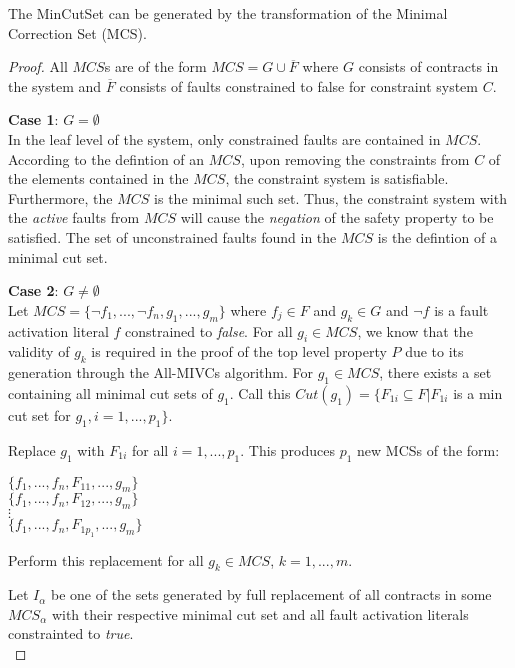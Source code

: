 \begin{theorem}  The MinCutSet can be generated by the transformation of the Minimal Correction Set (MCS).

\begin{proof}  All $MCS$s are of the form $MCS = G \cup \overline{F}$ where $G$ consists of contracts in the system and $\overline{F}$ consists of faults constrained to false for constraint system $C$. 

\textbf{Case 1}: $G = \emptyset$\\
In the leaf level of the system, only constrained faults are contained in $MCS$. According to the defintion of an $MCS$, upon removing the constraints from $C$ of the elements contained in the $MCS$, the constraint system is satisfiable. Furthermore, the $MCS$ is the minimal such set. Thus, the constraint system with the \textit{active} faults from $MCS$ will cause the \textit{negation} of the safety property to be satisfied. The set of unconstrained faults found in the $MCS$ is the defintion of a minimal cut set. 

\textbf{Case 2}: $G \neq \emptyset$\\
Let $MCS = \{\lnot f_1,...,\lnot f_n,g_1,...,g_m\}$ where $f_j \in F$ and $g_k \in G$ and $\lnot f$ is a fault activation literal $f$ constrained to \textit{false}. 
For all $g_i \in MCS$, we know that the validity of $g_k$ is required in the proof of the top level property $P$ due to its generation through the All-MIVCs algorithm. For $g_1 \in MCS$, there exists a set containing all minimal cut sets of $g_1$. Call this $Cut(g_1) = \{F_{1i} \subseteq F | F_{1i}$ is a min cut set for $g_1, i = 1,...,p_1\}$. 

Replace $g_1$ with $F_{1i}$ for all $i = 1,...,p_1$. This produces $p_1$ new MCSs of the form:
\begin{center}
$\{f_1,...,f_n,F_{11},...,g_m\}$\\
$\{f_1,...,f_n,F_{12},...,g_m\}$\\
$\vdots$\\
$\{f_1,...,f_n,F_{1p_1},...,g_m\}$\\
\end{center}

Perform this replacement for all $g_k \in MCS$, $k=1,...,m$. %

Let $I_\alpha$ be one of the sets generated by full replacement of all contracts in some $MCS_\alpha$ with their respective minimal cut set and all fault activation literals constrainted to \textit{true}.\\


\end{proof}
\end{theorem}
